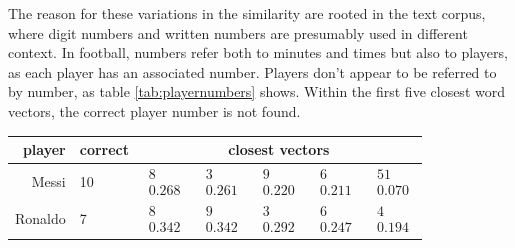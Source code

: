 \documentclass[10pt, a4paper]{UUThesisTemplate}
\begin{document}
The reason for these variations in the similarity are rooted in the text corpus, where digit numbers and written numbers are presumably used in different context. In football, numbers refer both to minutes and times but also to players, as each player has an associated number. Players don't appear to be referred to by number, as table \ref{tab:playernumbers} shows. Within the first five closest word vectors, the correct player number is not found.

\begin{table}[hb]\hspace{-1cm}
\footnotesize
\begin{tabular}{r l c c c c c}
player & correct\hspace{-20pt} & \multicolumn{5}{c}{closest vectors}\\\hline
Messi & 10 & $\begin{matrix} \text{8} \\ 0.268 \end{matrix}$  & $\begin{matrix} \text{3} \\ 0.261 \end{matrix}$  & $\begin{matrix} \text{9} \\ 0.220 \end{matrix}$  & $\begin{matrix} \text{6} \\ 0.211 \end{matrix}$  & $\begin{matrix} \text{51} \\ 0.070 \end{matrix}$\\
Ronaldo & 7 & $\begin{matrix} \text{8} \\ 0.342 \end{matrix}$  & $\begin{matrix} \text{9} \\ 0.342 \end{matrix}$  & $\begin{matrix} \text{3} \\ 0.292 \end{matrix}$  & $\begin{matrix} \text{6} \\ 0.247 \end{matrix}$  & $\begin{matrix} \text{4} \\ 0.194 \end{matrix}$\\

\end{tabular}
\end{table}
\end{document}
